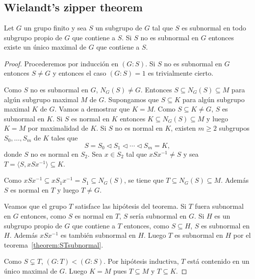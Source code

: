 \section{}

\subsection{Wielandt's zipper theorem}

\begin{theorem}[Wielandt]
	\label{thm:zipper}
	Let $G$ un grupo finito y sea $S$ un subgrupo de $G$ tal que $S$ es
	subnormal en todo subgrupo propio de $G$ que contiene a $S$. Si $S$ no es
	subnormal en $G$ entonces existe un único maximal de $G$ que contiene a
	$S$.
\end{theorem}

\begin{proof}
	Procederemos por inducción en $(G:S)$. Si $S$ no es subnormal en $G$
	entonces $S\ne G$ y entonces el caso $(G:S)=1$ es trivialmente cierto. 

	Como $S$ no es subnormal en $G$, $N_G(S)\ne G$. Entonces $S\subseteq
	N_G(S)\subseteq M$ para algún subgrupo maximal $M$ de $G$. Supongamos que
	$S\subseteq K$ para algún subgrupo maximal $K$ de $G$. Vamos a demostrar
	que $K=M$. Como $S\subseteq K\ne G$, $S$ es subnormal en $K$. Si $S$ es
	normal en $K$ entonces $K\subseteq N_G(S)\subseteq M$ y luego $K=M$ por
	maximalidad de $K$. Si $S$ no es normal en $K$, existen $m\geq2$ 
	subgrupos $S_0,\dots,S_m$ de $K$ tales que 
	\[
		S=S_0\triangleleft S_1\triangleleft\cdots\triangleleft S_m=K,
	\]
	donde $S$ no es normal en $S_2$.  Sea $x\in S_2$ tal que $xSx^{-1}\ne S$ y
	sea $T=\langle S,xSx^{-1}\rangle\subseteq K$. 

	Como $xSx^{-1}\subseteq xS_1x^{-1}=S_1\subseteq N_G(S)$, se tiene que
	$T\subseteq N_G(S)\subseteq M$. Además $S$ es normal en $T$ y luego $T\ne
	G$. 

	Veamos que el grupo $T$ satisface las hipótesis del teorema. Si $T$ fuera
	subnormal en $G$ entonces, como $S$ es normal en $T$, $S$ sería subnormal
	en $G$. Si $H$ es un subgrupo propio de $G$ que contiene a $T$ entonces,
	como $S\subseteq H$, $S$ es subnormal en $H$. Además $xSx^{-1}$ es también
	subnormal en $H$.  Luego $T$ es subnormal en $H$ por el
	teorema~\ref{theorem:STsubnormal}.

	Como $S\subsetneq T$, $(G:T)<(G:S)$. Por hipótesis inductiva, $T$ está
	contenido en un único maximal de $G$. Luego $K=M$ pues $T\subseteq M$ y
	$T\subseteq K$.
\end{proof}

